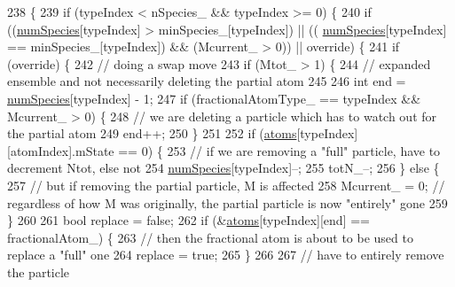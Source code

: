 \begin{DoxyCode}
238                                                                                    \{
239     \textcolor{keywordflow}{if} (typeIndex < nSpecies\_ && typeIndex >= 0) \{
240         \textcolor{keywordflow}{if} ((\hyperlink{classsim_system_a9eea865e6dc1cff377b1e79c4d9c23f0}{numSpecies}[typeIndex] > minSpecies\_[typeIndex]) || ((
      \hyperlink{classsim_system_a9eea865e6dc1cff377b1e79c4d9c23f0}{numSpecies}[typeIndex] == minSpecies\_[typeIndex]) && (Mcurrent\_ > 0)) || \textcolor{keyword}{override}) \{
241             \textcolor{keywordflow}{if} (\textcolor{keyword}{override}) \{
242                 \textcolor{comment}{// doing a swap move}
243                 \textcolor{keywordflow}{if} (Mtot\_ > 1) \{
244                     \textcolor{comment}{// expanded ensemble and not necessarily deleting the partial atom}
245 
246                     \textcolor{keywordtype}{int} end = \hyperlink{classsim_system_a9eea865e6dc1cff377b1e79c4d9c23f0}{numSpecies}[typeIndex] - 1;
247                     \textcolor{keywordflow}{if} (fractionalAtomType\_ == typeIndex && Mcurrent\_ > 0) \{
248                         \textcolor{comment}{// we are deleting a particle which has to watch out for the partial atom}
249                         end++;
250                     \}
251 
252                     \textcolor{keywordflow}{if} (\hyperlink{classsim_system_a90421b19082f7fb8fc23b7264b1161e4}{atoms}[typeIndex][atomIndex].mState == 0) \{
253                         \textcolor{comment}{// if we are removing a "full" particle, have to decrement Ntot, else not}
254                         \hyperlink{classsim_system_a9eea865e6dc1cff377b1e79c4d9c23f0}{numSpecies}[typeIndex]--;
255                         totN\_--;
256                     \} \textcolor{keywordflow}{else} \{
257                         \textcolor{comment}{// but if removing the partial particle, M is affected}
258                         Mcurrent\_ = 0; \textcolor{comment}{// regardless of how M was originally, the partial particle is now
       "entirely" gone}
259                     \}
260 
261                     \textcolor{keywordtype}{bool} replace = \textcolor{keyword}{false};
262                     \textcolor{keywordflow}{if} (&\hyperlink{classsim_system_a90421b19082f7fb8fc23b7264b1161e4}{atoms}[typeIndex][end] == fractionalAtom\_) \{
263                         \textcolor{comment}{// then the fractional atom is about to be used to replace a "full" one}
264                         replace = \textcolor{keyword}{true};
265                     \}
266 
267                     \textcolor{comment}{// have to entirely remove the particle}

\end{DoxyCode}
